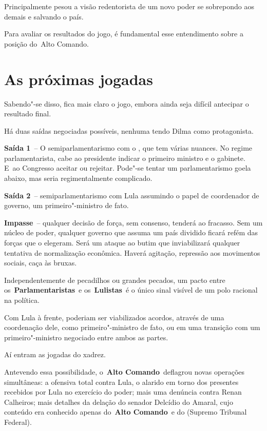 Principalmente pesou a visão redentorista de um novo poder se sobrepondo
aos demais e salvando o país.

Para avaliar os resultados do jogo, é fundamental esse entendimento
sobre a posição do~Alto Comando.~

\section{As próximas jogadas}

Sabendo"-se disso, fica mais claro o jogo, embora ainda seja difícil
antecipar o resultado final.

Há duas saídas negociadas possíveis, nenhuma tendo Dilma como
protagonista.

\textbf{Saída 1}~-- O semiparlamentarismo com o , que tem várias
nuances. No regime parlamentarista, cabe ao presidente indicar o
primeiro ministro e o gabinete. E~ao Congresso aceitar ou rejeitar.
Pode"-se tentar um parlamentarismo goela abaixo, mas seria
regimentalmente complicado.

\textbf{Saída 2}~-- semiparlamentarismo com Lula assumindo o papel de
coordenador de governo, um primeiro"-ministro de fato.

\textbf{Impasse}~-- qualquer decisão de força, sem consenso, tenderá ao
fracasso. Sem um núcleo de poder, qualquer governo que assuma um país
dividido ficará refém das forças que o elegeram. Será um ataque ao butim
que inviabilizará qualquer tentativa de normalização econômica. Haverá
agitação, repressão aos movimentos sociais, caça às bruxas.

Independentemente de pecadilhos ou grandes pecados, um pacto entre
os~\textbf{Parlamentaristas}~e os~\textbf{Lulistas}~é o único sinal
visível de um polo racional na política.

Com Lula à frente, poderiam ser viabilizados acordos, através de uma
coordenação dele, como primeiro"-ministro de fato, ou em uma transição
com um primeiro"-ministro negociado entre ambos as partes.

Aí entram as jogadas do xadrez.

Antevendo essa possibilidade, o~\textbf{Alto Comando}~deflagrou novas
operações simultâneas: a ofensiva total contra Lula, o alarido em torno
dos presentes recebidos por Lula no exercício do poder; mais uma
denúncia contra Renan Calheiros; mais detalhes da delação do senador
Delcídio do Amaral, cujo conteúdo era conhecido apenas do~\textbf{Alto
Comando}~e do  (Supremo Tribunal Federal).

